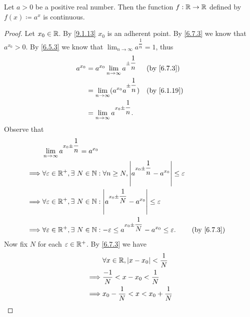 \begin{prop}\label{9.4.10}
  Let \(a > 0\) be a positive real number.
  Then the function \(f : \mathbb{R} \to \mathbb{R}\) defined by \(f(x) \coloneqq a^x\) is continuous.
\end{prop}

\begin{proof}
  Let \(x_0 \in \mathbb{R}\).
  By \cref{9.1.13} \(x_0\) is an adherent point.
  By \cref{6.7.3} we know that \(a^{x_0} > 0\).
  By \cref{6.5.3} we know that \(\lim_{n \to \infty} a^{\dfrac{1}{n}} = 1\), thus
  \begin{align*}
    a^{x_0} & = a^{x_0} \lim_{n \to \infty} a^{\pm \dfrac{1}{n}}   &  & \by{6.7.3}                \\
            & = \lim_{n \to \infty} (a^{x_0} a^{\pm \dfrac{1}{n}}) &  & \text{(by \cref{6.1.19})} \\
            & = \lim_{n \to \infty} a^{x_0 \pm \dfrac{1}{n}}.
  \end{align*}
  Observe that
  \begin{align*}
             & \lim_{n \to \infty} a^{x_0 \pm \dfrac{1}{n}} = a^{x_0}                                                                                        \\
    \implies & \forall \varepsilon \in \R^+, \exists\ N \in \N : \forall n \geq N, \abs{a^{x_0 \pm \dfrac{1}{n}} - a^{x_0}} \leq \varepsilon                 \\
    \implies & \forall \varepsilon \in \R^+, \exists\ N \in \N : \abs{a^{x_0 \pm \dfrac{1}{N}} - a^{x_0}} \leq \varepsilon                                   \\
    \implies & \forall \varepsilon \in \R^+, \exists\ N \in \N : -\varepsilon \leq a^{x_0 \pm \dfrac{1}{N}} - a^{x_0} \leq \varepsilon.      &  & \by{6.7.3}
  \end{align*}
  Now fix \(N\) for each \(\varepsilon \in \mathbb{R}^+\).
  By \cref{6.7.3} we have
  \begin{align*}
             & \forall x \in \R, \abs{x - x_0} < \dfrac{1}{N}                                                                                                             \\
    \implies & \dfrac{-1}{N} < x - x_0 < \dfrac{1}{N}                                                                                                                     \\
    \implies & x_0 - \dfrac{1}{N} < x < x_0 + \dfrac{1}{N}                                                                                                                \\

\end{align*}
\end{proof}

